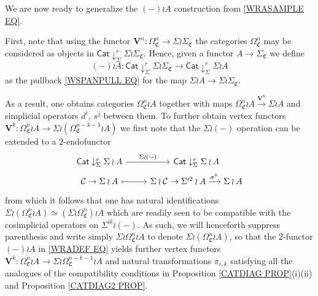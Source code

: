 \documentclass[a4paper,10pt
,draft
]{article}%
\numberwithin{equation}{section}
\numberwithin{figure}{section}
\theoremstyle{definition} %
\newcommand{\1}{\ensuremath{\mathbbm 1}}%
\begin{document}






We are now ready to generalize the $(-) \wr A$
construction from \eqref{WRASAMPLE EQ}.

First, note that using the functor
$\boldsymbol{V}^n \colon \Omega^n_{\mathfrak{C}} \to \Sigma \wr \Sigma_{\mathfrak{C}}$
the categories 
$\Omega^n_{\mathfrak{C}}$ may be considered as objects in
$\mathsf{Cat} \downarrow^r_{\Sigma} \Sigma \wr \Sigma_{\mathfrak{C}}$.
Hence, given a functor $A \to \Sigma_{\mathfrak{C}}$
we define 
\begin{equation}\label{WRADEF EQ}
(-) \wr A \colon 
\mathsf{Cat} \downarrow^r_{\Sigma} \Sigma \wr \Sigma_{\mathfrak{C}}
\to
\mathsf{Cat} \downarrow^r_{\Sigma} \Sigma \wr A
\end{equation}
as the pullback \eqref{WSPANPULL EQ} for the map
$\Sigma \wr A \to \Sigma \wr \Sigma_{\mathfrak{C}}$.

As a result, one obtains categories $\Omega_{\mathfrak{C}}^n \wr A$
together with maps 
$\Omega_{\mathfrak{C}}^n \wr A 
\xrightarrow{\boldsymbol{V}^n} \Sigma \wr A$
and simplicial operators $d^i$, $s^j$ between them.
To further obtain vertex functors
$\boldsymbol{V}^k \colon \Omega^n_{\mathfrak{C}} \wr A
\to 
\Sigma \wr \left(\Omega^{n-k-1}_{\mathfrak{C}} \wr A \right)$
we first note that the $\Sigma \wr (-)$ operation can be extended to a $2$-endofunctor
\[
\begin{tikzcd}[row sep = 0pt]
	\mathsf{Cat} \downarrow^r_{\Sigma} \Sigma \wr A \ar{r}{\Sigma \wr (-)} &
	\mathsf{Cat} \downarrow^r_{\Sigma} \Sigma \wr A
\\
	\mathcal{C} \to \Sigma \wr A \ar[mapsto]{r} &
	\Sigma \wr \mathcal{C} \to \Sigma^{\wr 2} \wr A \xrightarrow{\sigma^{0}} \Sigma \wr A 
\end{tikzcd}
\]
from which it follows that one has natural identifications
$\Sigma \wr \left(\Omega^{n}_{\mathfrak{C}} \wr A \right)
\simeq 
\left(\Sigma \wr \Omega^{n}_{\mathfrak{C}}\right) \wr A $
which are readily seen to be compatible with the cosimplicial operators on $\Sigma^{\wr k} \wr (-)$.
As such, we will henceforth suppress parenthesis and write 
simply 
$\Sigma \wr \Omega^{n}_{\mathfrak{C}} \wr A$
to denote 
$\Sigma \wr \left(\Omega^{n}_{\mathfrak{C}} \wr A \right)$,
so that the $2$-functor $(-)\wr A$ in \eqref{WRADEF EQ}
yields further vertex functors 
$\boldsymbol{V}^k \colon \Omega^n_{\mathfrak{C}} \wr A
\to 
\Sigma \wr \Omega^{n-k-1}_{\mathfrak{C}} \wr A$
and natural transformations $\pi_{i,k}$
satisfying all the analogues of the compatibility conditions
in Proposition \ref{CATDIAG PROP}(i)(ii) and Proposition \ref{CATDIAG2 PROP}.
\end{document}
